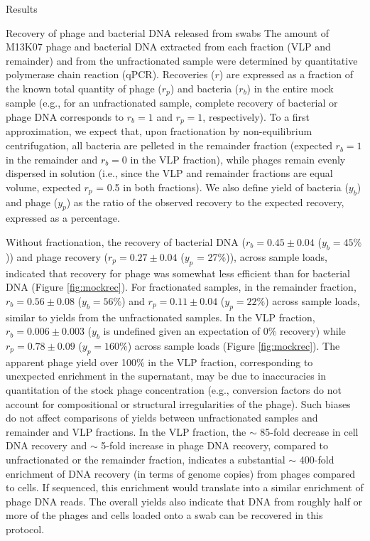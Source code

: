 \documentclass[oneside,12pt,final]{sty/ucthesis-CA2012}
\begin{document}
\begin{mainmatter}
\begin{section}{Results}
\begin{subsection}{Recovery of phage and bacterial DNA released from swabs}
The amount of M13K07 phage and bacterial DNA extracted from each fraction (VLP and remainder) and from the unfractionated sample were determined by quantitative polymerase chain reaction (qPCR). Recoveries ($r$) are expressed as a fraction of the known total quantity of phage ($r_{p}$) and bacteria ($r_{b}$) in the entire mock sample (e.g., for an unfractionated sample, complete recovery of bacterial or phage DNA corresponds to $r_{b} = 1$ and $r_{p} = 1$, respectively). To a first approximation, we expect that, upon fractionation by non-equilibrium centrifugation, all bacteria are pelleted in the remainder fraction (expected $r_{b} = 1$ in the remainder and $r_{b} = 0$ in the VLP fraction), while phages remain evenly dispersed in solution (i.e., since the VLP and remainder fractions are equal volume, expected $r_{p}$ = 0.5 in both fractions). We also define yield of bacteria ($y_{b}$) and phage ($y_{p}$) as the ratio of the observed recovery to the expected recovery, expressed as a percentage.

Without fractionation, the recovery of bacterial DNA ($r_{b} = 0.45 \pm 0.04$ ($y_{b} = 45\%$)) and phage recovery ($r_{p} = 0.27 \pm 0.04$ ($y_{p}$ = 27\%)), across sample loads, indicated that recovery for phage was somewhat less efficient than for bacterial DNA (Figure \ref{fig:mockrec}). For fractionated samples, in the remainder fraction, $r_{b} = 0.56 \pm 0.08$ ($y_{b} = 56\%$) and $r_{p} = 0.11 \pm 0.04$ ($y_{p} = 22\%$) across sample loads, similar to yields from the unfractionated samples. In the VLP fraction, $r_{b} = 0.006 \pm 0.003$ ($y_{b}$ is undefined given an expectation of 0\% recovery) while $r_{p} = 0.78 \pm 0.09$ ($y_{p} = 160\%$) across sample loads (Figure \ref{fig:mockrec}). The apparent phage yield over 100\% in the VLP fraction, corresponding to unexpected enrichment in the supernatant, may be due to inaccuracies in quantitation of the stock phage concentration (e.g., conversion factors do not account for compositional or structural irregularities of the phage). Such biases do not affect comparisons of yields between unfractionated samples and remainder and VLP fractions. In the VLP fraction, the $\sim$ 85-fold decrease in cell DNA recovery and $\sim$ 5-fold increase in phage DNA recovery, compared to unfractionated or the remainder fraction, indicates a substantial $\sim$ 400-fold enrichment of DNA recovery (in terms of genome copies) from phages compared to cells. If sequenced, this enrichment would translate into a similar enrichment of phage DNA reads. The overall yields also indicate that DNA from roughly half or more of the phages and cells loaded onto a swab can be recovered in this protocol.


\end{subsection}
\end{section}
\end{mainmatter}
\end{document}
